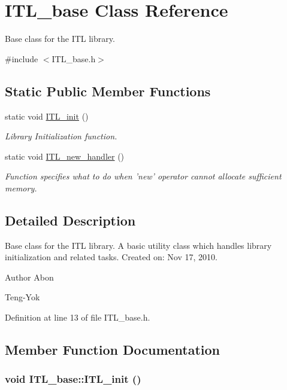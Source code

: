 \hypertarget{classITL__base}{
\section{ITL\_\-base Class Reference}
\label{classITL__base}
}


Base class for the ITL library.  




{\ttfamily \#include $<$ITL\_\-base.h$>$}

\subsection*{Static Public Member Functions}
\begin{DoxyCompactItemize}
\item 
static void \hyperlink{classITL__base_ab734bb82632a3936d0681e28a86de94e}{ITL\_\-init} ()
\begin{DoxyCompactList}\small\item\em Library Initialization function. \item\end{DoxyCompactList}\item 
static void \hyperlink{classITL__base_a94be5c706baec9a4c1eb0bc715acdf7e}{ITL\_\-new\_\-handler} ()
\begin{DoxyCompactList}\small\item\em Function specifies what to do when 'new' operator cannot allocate sufficient memory. \item\end{DoxyCompactList}\end{DoxyCompactItemize}


\subsection{Detailed Description}
Base class for the ITL library. A basic utility class which handles library initialization and related tasks. Created on: Nov 17, 2010. \begin{DoxyAuthor}{Author}
Abon 

Teng-\/Yok 
\end{DoxyAuthor}


Definition at line 13 of file ITL\_\-base.h.



\subsection{Member Function Documentation}
\hypertarget{classITL__base_ab734bb82632a3936d0681e28a86de94e}{
\subsubsection[{ITL\_\-init}]{\setlength{\rightskip}{0pt plus 5cm}void ITL\_\-base::ITL\_\-init ()}}
\label{classITL__base_ab734bb82632a3936d0681e28a86de94e}


